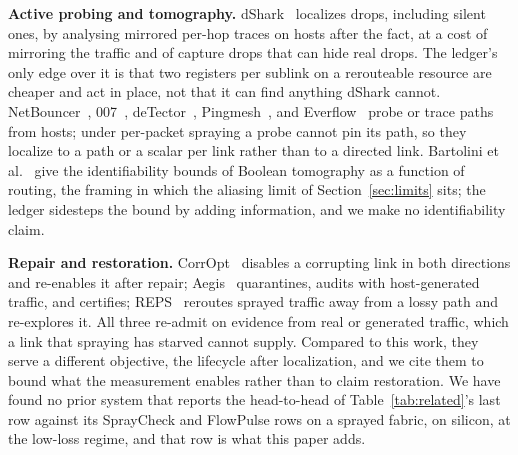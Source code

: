\textbf{Active probing and tomography.} dShark~\cite{dshark} localizes drops, including silent ones, by analysing mirrored per-hop traces on hosts after the fact, at a cost of mirroring the traffic and of capture drops that can hide real drops. The ledger's only edge over it is that two registers per sublink on a rerouteable resource are cheaper and act in place, not that it can find anything dShark cannot. NetBouncer~\cite{netbouncer}, 007~\cite{007}, deTector~\cite{detector}, Pingmesh~\cite{pingmesh}, and Everflow~\cite{everflow} probe or trace paths from hosts; under per-packet spraying a probe cannot pin its path, so they localize to a path or a scalar per link rather than to a directed link. Bartolini et al.~\cite{bartolini} give the identifiability bounds of Boolean tomography as a function of routing, the framing in which the aliasing limit of Section~\ref{sec:limits} sits; the ledger sidesteps the bound by adding information, and we make no identifiability claim.

\textbf{Repair and restoration.} CorrOpt~\cite{corropt} disables a corrupting link in both directions and re-enables it after repair; Aegis~\cite{aegis} quarantines, audits with host-generated traffic, and certifies; REPS~\cite{reps} reroutes sprayed traffic away from a lossy path and re-explores it. All three re-admit on evidence from real or generated traffic, which a link that spraying has starved cannot supply. Compared to this work, they serve a different objective, the lifecycle after localization, and we cite them to bound what the measurement enables rather than to claim restoration. We have found no prior system that reports the head-to-head of Table~\ref{tab:related}'s last row against its SprayCheck and FlowPulse rows on a sprayed fabric, on silicon, at the low-loss regime, and that row is what this paper adds.
